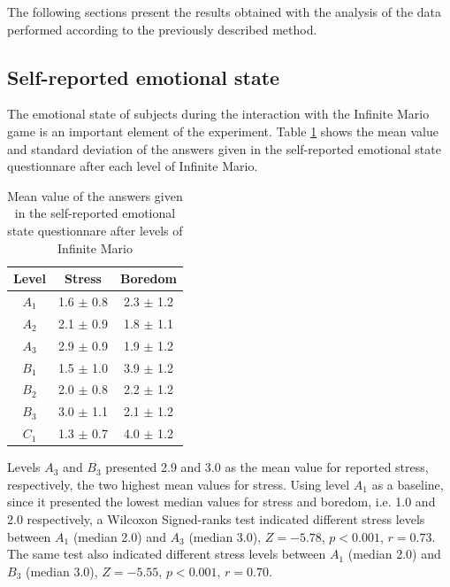 The following sections present the results obtained with the analysis of the data performed according to the previously described method.

\subsection{Self-reported emotional state}

The emotional state of subjects during the interaction with the Infinite Mario game is an important element of the experiment. Table \ref{table:experiment2-mario-emotions} shows the mean value and standard deviation of the answers given in the self-reported emotional state questionnare after each level of Infinite Mario.

\begin{table}[!htbp]
  \centering
  \caption{Mean value of the answers given in the self-reported emotional state questionnare after levels of Infinite Mario}
  \label{table:experiment2-mario-emotions}
  \begin{tabular}{ccc}
    \hline
      \textbf{Level} & \textbf{Stress} & \textbf{Boredom} \\
    \hline
      $A_1$ & 1.6 $\pm$ 0.8 & 2.3 $\pm$ 1.2 \\
      $A_2$ & 2.1 $\pm$ 0.9 & 1.8 $\pm$ 1.1 \\
      $A_3$ & 2.9 $\pm$ 0.9 & 1.9 $\pm$ 1.2 \\
      $B_1$ & 1.5 $\pm$ 1.0 & 3.9 $\pm$ 1.2 \\
      $B_2$ & 2.0 $\pm$ 0.8 & 2.2 $\pm$ 1.2 \\
      $B_3$ & 3.0 $\pm$ 1.1 & 2.1 $\pm$ 1.2 \\
      $C_1$ & 1.3 $\pm$ 0.7 & 4.0 $\pm$ 1.2 \\
    \hline
  \end{tabular}
\end{table}

Levels $A_3$ and $B_3$ presented 2.9 and 3.0 as the mean value for reported stress, respectively, the two highest mean values for stress. Using level $A_1$ as a baseline, since it presented the lowest median values for stress and boredom, i.e. 1.0 and 2.0 respectively, a Wilcoxon Signed-ranks test indicated different stress levels between $A_1$ (median 2.0) and $A_3$ (median 3.0), $Z=-5.78$, $p < 0.001$, $r=0.73$. The same test also indicated different stress levels between $A_1$ (median 2.0) and $B_3$ (median 3.0), $Z=-5.55$, $p < 0.001$, $r=0.70$.

